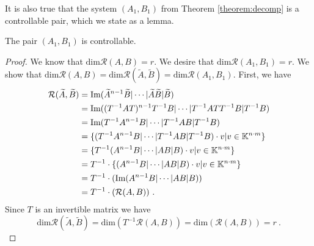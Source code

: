 It is also true that the system $(A_1,B_1)$ from Theorem \ref{theorem:decomp} is a controllable pair, which we state as a lemma.

\begin{lemma}
	\label{lem:A_1B_1controllable}
	The pair $(A_1,B_1)$ is controllable.
\end{lemma}

\begin{proof}
	We know that $\text{dim}\mathcal{R}(A,B)=r$. We desire that $\text{dim}\mathcal{R}(A_1,B_1)=r$. We show that $\text{dim}\mathcal{R}(A,B)=\text{dim}\mathcal{R}(\widetilde{A},\widetilde{B})=\text{dim}\mathcal{R}(A_1,B_1)$. 
	First, we have 
	\begin{align*}
		\mathcal{R}(\widetilde{A},\widetilde{B})&=\text{Im}(\widetilde{A}^{n-1}\widetilde{B}|\cdots|\widetilde{A}\widetilde{B}|\widetilde{B}) \\
		&=\text{Im}((T^{-1}AT)^{n-1}T^{-1}B|\cdots|T^{-1}ATT^{-1}B|T^{-1}B) \\
		&=\text{Im}(T^{-1}A^{n-1}B|\cdots|T^{-1}AB|T^{-1}B) \\
		&=\{(T^{-1}A^{n-1}B|\cdots|T^{-1}AB|T^{-1}B)\cdot v | v \in \mathbb{K}^{n\cdot m}\} \\
		&=\{T^{-1}(A^{n-1}B|\cdots|AB|B)\cdot v | v \in \mathbb{K}^{n\cdot m}\} \\
		&=T^{-1}\cdot\{(A^{n-1}B|\cdots|AB|B)\cdot v | v \in \mathbb{K}^{n\cdot m}\} \\
		&=T^{-1}\cdot(\text{Im}(A^{n-1}B|\cdots|AB|B)) \\
		&=T^{-1}\cdot(\mathcal{R}(A,B))
		\ .
	\end{align*}
	Since $T$ is an invertible matrix we have
	$$\text{dim}\mathcal{R}(\widetilde{A},\widetilde{B})=\text{dim}(T^{-1}\mathcal{R}(A,B))=\text{dim}(\mathcal{R}(A,B))=r\ .$$


\end{proof}
